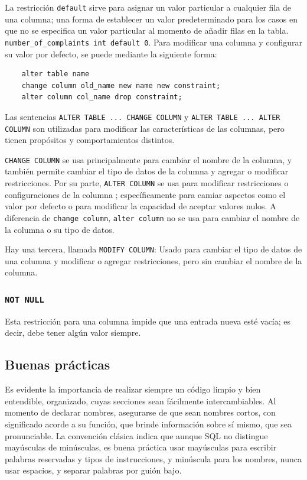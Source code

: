    La restricción \texttt{default} sirve para asignar un valor particular a cualquier fila de una columna; una forma de establecer un valor predeterminado para los casos en que no se especifica un valor particular al momento de añadir filas en la tabla. \texttt{number\_of\_complaints int default 0}.  Para modificar una columna y configurar su valor por defecto, se puede mediante la siguiente forma:
    \begin{verbatim}
    alter table name
    change column old_name new name new constraint;
    alter column col_name drop constraint;
    \end{verbatim}
    Las sentencias  \verb|ALTER TABLE ... CHANGE COLUMN| y \verb|ALTER TABLE ... ALTER COLUMN| son utilizadas para modificar las características de las columnas, pero tienen propósitos y comportamientos distintos. 

    \texttt{CHANGE COLUMN} se usa principalmente para cambiar el nombre de la columna, y también permite cambiar el tipo de datos de la columna y agregar o modificar restricciones.  Por su parte, \texttt{ALTER COLUMN} se usa para modificar restricciones o configuraciones de la columna ; específicamente para camiar aspectos como el valor por defecto o para modificar la capacidad de aceptar valores nulos. A diferencia de \texttt{change column}, \texttt{alter column} no se usa para cambiar el nombre de la columna o su tipo de datos.

    Hay una tercera, llamada \verb|MODIFY COLUMN|: Usado para cambiar el tipo de datos de una columna y modificar o agregar restricciones, pero sin cambiar el nombre de la columna.

    \subsubsection{\texttt{NOT NULL}}
    Esta restricción para una columna impide que una entrada nueva esté vacía; es decir, debe tener algún valor siempre. 

    \subsection{Buenas prácticas}

    Es evidente la importancia de realizar siempre un código limpio y bien entendible, organizado, cuyas secciones sean fácilmente intercambiables. Al momento de declarar nombres, asegurarse de que sean nombres cortos, con significado acorde a su función, que brinde información sobre sí mismo, que sea pronunciable. 
    La convención clásica indica que aunque SQL no distingue mayúsculas de minúsculas, es buena práctica usar mayúsculas para escribir palabras reservadas y tipos de instrucciones, y minúscula para los nombres, nunca usar espacios, y separar palabras por guión bajo.
